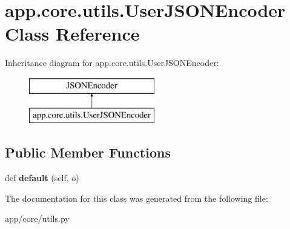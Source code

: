 \hypertarget{classapp_1_1core_1_1utils_1_1_user_j_s_o_n_encoder}{}\section{app.\+core.\+utils.\+User\+J\+S\+O\+N\+Encoder Class Reference}
\label{classapp_1_1core_1_1utils_1_1_user_j_s_o_n_encoder}
Inheritance diagram for app.\+core.\+utils.\+User\+J\+S\+O\+N\+Encoder\+:\begin{figure}[H]
\begin{center}
\leavevmode
\includegraphics[height=2.000000cm]{classapp_1_1core_1_1utils_1_1_user_j_s_o_n_encoder}
\end{center}
\end{figure}
\subsection*{Public Member Functions}
\begin{DoxyCompactItemize}
\item 
\mbox{\label{classapp_1_1core_1_1utils_1_1_user_j_s_o_n_encoder_af14ac95dedd2f4cadf7b86fd77875f00}} 
def {\bfseries default} (self, o)
\end{DoxyCompactItemize}


The documentation for this class was generated from the following file\+:\begin{DoxyCompactItemize}
\item 
app/core/utils.\+py\end{DoxyCompactItemize}
